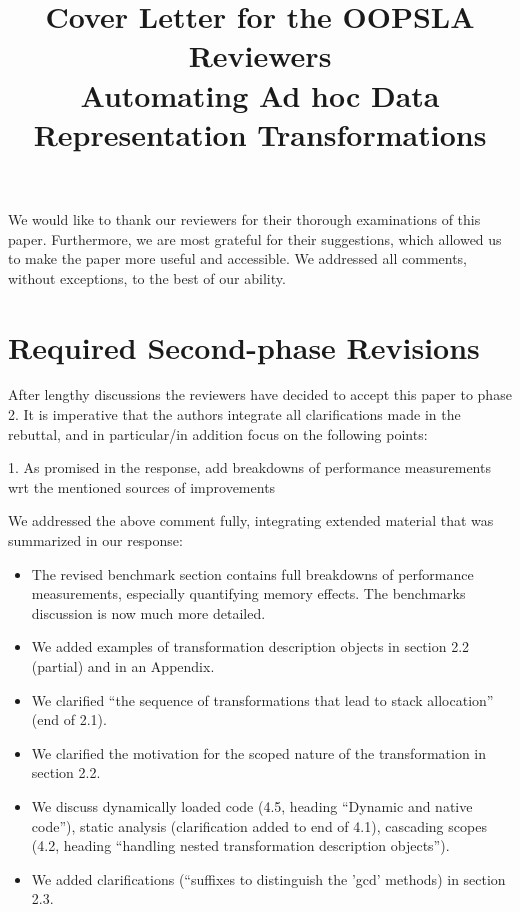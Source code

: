 \documentclass[9pt]{article}
\newenvironment{editorial}
{ \color{Red} \framebox{{\bf REVISION}} }
{  }
\newenvironment{answer}
{ \em \framebox{{\bf AUTHOR RESPONSE}} }
{  }
\begin{document}
\title{Cover Letter for the OOPSLA Reviewers\\\Large Automating Ad hoc Data Representation Transformations}
\maketitle

We would like to thank our reviewers for their thorough examinations of this paper. Furthermore, we are most grateful for their suggestions, which allowed us to make the paper more useful and accessible. We addressed all comments, without exceptions, to the best of our ability.


\section{Required Second-phase Revisions}


\begin{editorial}
After lengthy discussions the reviewers have decided to accept this paper to phase 2. It is imperative that the authors integrate all clarifications made in the rebuttal, and in particular/in addition focus on the following points:

1. As promised in the response, add breakdowns of performance measurements wrt the mentioned sources of improvements
\end{editorial}

\begin{answer}

We addressed the above comment fully, integrating extended material that was summarized in our
response:

\begin{itemize}
\item The revised benchmark section contains full breakdowns of performance measurements, especially
quantifying memory effects. The benchmarks discussion is now much more detailed.

\item We added examples of transformation description objects in section 2.2 (partial) and in an Appendix.
\item We clarified ``the sequence of transformations that lead to stack allocation'' (end of 2.1).
\item We clarified the motivation for the scoped nature of the transformation in section 2.2.
\item We discuss dynamically loaded code (4.5, heading ``Dynamic and native code''), static analysis
  (clarification added to end of 4.1), cascading scopes (4.2, heading ``handling nested transformation description objects'').
\item We added clarifications (``suffixes to distinguish the 'gcd' methods) in section 2.3.
\end{itemize}

\end{answer}
\end{document}
